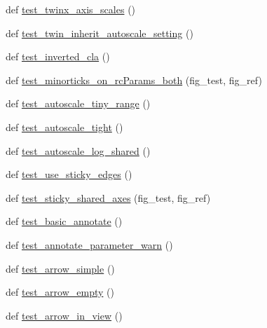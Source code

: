 \begin{DoxyCompactItemize}
\item 
def \hyperlink{namespacematplotlib_1_1tests_1_1test__axes_adfd54c73fa2165ba6bb181e7add19a55}{test\+\_\+twinx\+\_\+axis\+\_\+scales} ()
\item 
def \hyperlink{namespacematplotlib_1_1tests_1_1test__axes_a3758ec4d80c0701be7a6f5e3824adb7e}{test\+\_\+twin\+\_\+inherit\+\_\+autoscale\+\_\+setting} ()
\item 
def \hyperlink{namespacematplotlib_1_1tests_1_1test__axes_ae22fa2788d3253fe167180b282327351}{test\+\_\+inverted\+\_\+cla} ()
\item 
def \hyperlink{namespacematplotlib_1_1tests_1_1test__axes_a51b2f83e860e86b502e35073d9c6e49e}{test\+\_\+minorticks\+\_\+on\+\_\+rc\+Params\+\_\+both} (fig\+\_\+test, fig\+\_\+ref)
\item 
def \hyperlink{namespacematplotlib_1_1tests_1_1test__axes_ae45ce297dadb6ddcf9c52b748423db0e}{test\+\_\+autoscale\+\_\+tiny\+\_\+range} ()
\item 
def \hyperlink{namespacematplotlib_1_1tests_1_1test__axes_a0157dfe4d8001ec9e88ac66664f860a5}{test\+\_\+autoscale\+\_\+tight} ()
\item 
def \hyperlink{namespacematplotlib_1_1tests_1_1test__axes_a76136f0307509257dc8500f5f0222c59}{test\+\_\+autoscale\+\_\+log\+\_\+shared} ()
\item 
def \hyperlink{namespacematplotlib_1_1tests_1_1test__axes_acfae7548eda385e18b1cce922c4f16b3}{test\+\_\+use\+\_\+sticky\+\_\+edges} ()
\item 
def \hyperlink{namespacematplotlib_1_1tests_1_1test__axes_a5784e798ca1ac8ac0b17f0db1bfcbb8c}{test\+\_\+sticky\+\_\+shared\+\_\+axes} (fig\+\_\+test, fig\+\_\+ref)
\item 
def \hyperlink{namespacematplotlib_1_1tests_1_1test__axes_a82883788a23877742b564f2a966033b8}{test\+\_\+basic\+\_\+annotate} ()
\item 
def \hyperlink{namespacematplotlib_1_1tests_1_1test__axes_a5231c8b5051b6c17c0c8af6cd437d600}{test\+\_\+annotate\+\_\+parameter\+\_\+warn} ()
\item 
def \hyperlink{namespacematplotlib_1_1tests_1_1test__axes_abb9aa7f0c26872587d0100d9f1031b3b}{test\+\_\+arrow\+\_\+simple} ()
\item 
def \hyperlink{namespacematplotlib_1_1tests_1_1test__axes_a77da3e5ba5c78718df45ef34dc0a728f}{test\+\_\+arrow\+\_\+empty} ()
\item 
def \hyperlink{namespacematplotlib_1_1tests_1_1test__axes_a8c621e6c8894f2477435d2a29f21d500}{test\+\_\+arrow\+\_\+in\+\_\+view} ()
\item 

\end{DoxyCompactItemize}
